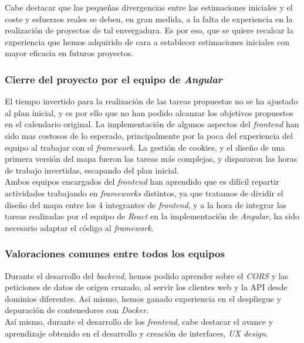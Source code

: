 \documentclass[11pt, a4paper, titlepage]{article}
\begin{document}
Cabe destacar que las pequeñas divergencias entre las estimaciones iniciales y el coste y esfuerzos reales se deben, en gran medida, a la falta de experiencia en la realización de proyectos de tal envergadura. Es por eso, que se quiere recalcar la experiencia que hemos adquirido de cara a establecer estimaciones iniciales con mayor eficacia en futuros proyectos. \\


\subsubsection{Cierre del proyecto por el equipo de \textit{Angular}}

El tiempo invertido para la realización de las tareas propuestas no se ha ajustado al plan inicial, y es por ello que no han podido alcanzar los objetivos propuestos en el calendario original. La implementación de algunos aspectos del \textit{frontend} han sido mas costosos de lo esperado, principalmente por la poca del experiencia del equipo al trabajar con el \textit{framework}. La gestión de cookies, y el diseño de una primera versión del mapa fueron las tareas más complejas, y dispararon las horas de trabajo invertidas, escapando del plan inicial.
\\

Ambos equipos encargados del \textit{frontend} han aprendido que es difícil repartir actividades trabajando en \textit{frameworks} distintos, ya que tratamos de dividir el diseño del mapa entre los 4 integrantes de \textit{frontend}, y a la hora de integrar las tareas realizadas por el equipo de \textit{React} en la implementación de \textit{Angular}, ha sido necesario adaptar el código al \textit{framework}. \\


\subsubsection{Valoraciones comunes entre todos los equipos}

Durante el desarrollo del \textit{backend}, hemos podido aprender sobre el \textit{CORS} y las peticiones de datos de origen cruzado, al servir los clientes web y la API desde dominios diferentes. Así mismo, hemos ganado experiencia en el despliegue y depuración de contenedores con \textit{Docker}. \\

Así mismo, durante el desarrollo de los \textit{frontend}, cabe destacar el avance y aprendizaje obtenido en el desarrollo y creación de interfaces, \textit{UX design}.\\
\end{document}
